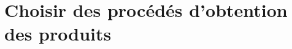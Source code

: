 \graphicspath{{\repStyle/png/}{../PPM/PPM-02/2001_BoitierDifferentiel/images/}} 
 
 
\graphicspath{{\repStyle/png/}{../PPM/PPM-02/2002_AxeCommande/images/}} 
 
 
\graphicspath{{\repStyle/png/}{../PPM/PPM-02/2003_Fourchette/images/}} 
 
 
\graphicspath{{\repStyle/png/}{../PPM/PPM-02/2004_Secateur/images/}} 
 
 
\clearpage 
\newpage 
\section{Choisir des procédés d'obtention des produits} 
\clearpage 
\newpage 
